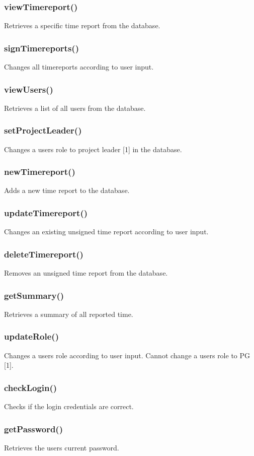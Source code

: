 \documentclass{article}
\begin{document}
\subsubsection{viewTimereport()}
Retrieves a specific time report from the database.
\subsubsection{signTimereports()}
Changes all timereports according to user input.
\subsubsection{viewUsers()}
Retrieves a list of all users from the database.
\subsubsection{setProjectLeader()}
Changes a users role to project leader [1] in the database.
\subsubsection{newTimereport()}
Adds a new time report to the database.
\subsubsection{updateTimereport()}
Changes an existing unsigned time report according to user input.
\subsubsection{deleteTimereport()}
Removes an unsigned time report from the database. 

\subsubsection{getSummary()}
Retrieves a summary of all reported time.
\subsubsection{updateRole()}
Changes a users role according to user input. Cannot change a users role to PG [1].
\subsubsection{checkLogin()}
Checks if the login credentials are correct.
\subsubsection{getPassword()}
Retrieves the users current password.
\end{document}
